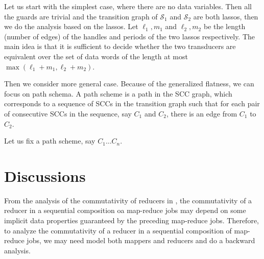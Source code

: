 \documentclass[11pt]{article}
\def\Ss{{\mathcal{S} }}
\begin{document}
Let us start with the simplest case, where there are no data variables. Then all the guards are trivial and the transition graph of $\Ss_1$ and $\Ss_2$ are both lassos, then we do the analysis based on the lassos. Let $\ell_1,m_1$ and $\ell_2,m_2$ be the length (number of edges) of the handles and periods of the two lassos respectively. The main idea is that it is sufficient to decide whether the two transducers are equivalent over the set of data words of the length at most $\max(\ell_1+m_1,\ell_2+m_2)$.

Then we consider more general case. Because of the generalized flatness, we can focus on path schema. A path scheme is a path in the SCC graph, which corresponds to a sequence of SCCs in the transition graph such that for each pair of consecutive SCCs in the sequence, say $C_1$ and $C_2$, there is an edge from $C_1$ to $C_2$.

Let us fix a path scheme, say $C_1 \dots C_n$.
\section{Discussions}

From the analysis of the commutativity of reducers in \cite{XZZ+14}, the commutativity of a reducer in a sequential composition oa map-reduce jobs may depend on some implicit data properties guaranteed by the preceding map-reduce jobs. Therefore, to analyze the commutativity of a reducer in a sequential composition of map-reduce jobs, we may need model both mappers and reducers and do a backward analysis.



\end{document}
